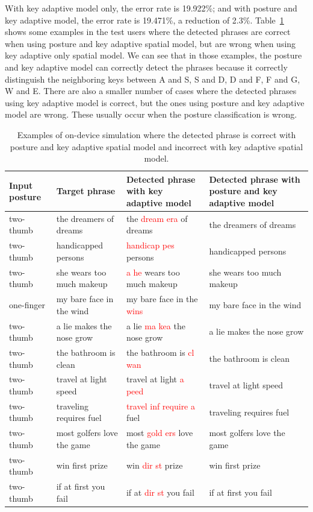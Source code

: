 \documentclass{sigchi}
\newcommand\tabhead[1]{\small\textbf{#1}}
\begin{document}
With key adaptive model only, the error rate is 19.922\%; and with posture and key
adaptive model, the error rate is 19.471\%, a reduction of 2.3\%. Table~\ref{tab:on-device} shows some examples
in the test users where the detected phrases are correct when using posture and key adaptive spatial model, but
are wrong when using key adaptive only spatial model. We can see that in those examples,
the posture and key adaptive model can correctly detect the phrases because it
correctly distinguish the neighboring keys between A and S, S and D,
D and F, F and G, W and E. There are also a smaller number of cases where the detected phrases using key 
adaptive model is correct, but the ones using posture and key adaptive model are
wrong. These usually occur when the posture classification is wrong. 

\begin{table}[tb]
  \centering
  \begin{tabularx}{0.925\textwidth}{|l|l|l|l|}
  \hline
  \tabhead{Input posture} & \tabhead{Target phrase} & \tabhead{Detected phrase with key adaptive model} 
  & \multicolumn{1}{|p{0.526\columnwidth}|}{\tabhead{Detected phrase with posture and key adaptive model}}\\
  \hline
  two-thumb & the dreamers of dreams & the \textcolor{red}{dream era} of dreams & the dreamers of dreams  \\
  \hline
  two-thumb & handicapped persons & \textcolor{red}{handicap pes} persons & handicapped persons \\
  \hline
  two-thumb & she wears too much makeup & \textcolor{red}{a he} wears too much makeup & she wears too much makeup \\
  \hline
  one-finger & my bare face in the wind & my bare face in the \textcolor{red}{wins} & my bare face in the wind \\ 
  \hline
  two-thumb & a lie makes the nose grow & a lie \textcolor{red}{ma kea} the nose grow & a lie makes the nose grow \\
  \hline 
  two-thumb & the bathroom is clean & the bathroom is \textcolor{red}{cl wan} & the bathroom is clean \\
  \hline 
  two-thumb & travel at light speed & travel at light \textcolor{red}{a peed} & travel at light speed \\ 
  \hline
  two-thumb & traveling requires fuel & \textcolor{red}{travel inf require a} fuel & traveling requires fuel \\
  \hline 
  two-thumb & most golfers love the game & most \textcolor{red}{gold ers} love the game & most golfers love the game \\ 
  \hline
  two-thumb & win first prize & win \textcolor{red}{dir st} prize & win first prize \\ 
  \hline
  two-thumb & if at first you fail & if at \textcolor{red}{dir st} you fail & if at first you fail \\ 
  \hline
  \end{tabularx}
  \caption{Examples of on-device simulation where the detected phrase is correct
  with posture and key adaptive spatial model and incorrect with key adaptive spatial
  model.}
  \label{tab:on-device}
\end{table}
\end{document}
